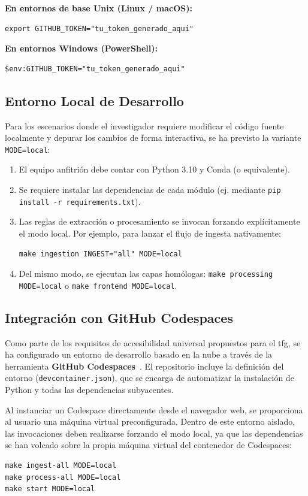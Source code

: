 \textbf{En entornos de base Unix (Linux / macOS):}
\begin{verbatim}
export GITHUB_TOKEN="tu_token_generado_aqui"
\end{verbatim}

\textbf{En entornos Windows (PowerShell):}
\begin{verbatim}
$env:GITHUB_TOKEN="tu_token_generado_aqui"
\end{verbatim}

\subsection{Entorno Local de Desarrollo}
Para los escenarios donde el investigador requiere modificar el código fuente
localmente y depurar los cambios de forma interactiva, se ha previsto la
variante \texttt{MODE=local}:
\begin{enumerate}
    \item El equipo anfitrión debe contar con Python 3.10 y Conda (o equivalente).
    \item Se requiere instalar las dependencias de cada módulo (ej. mediante \texttt{pip
              install -r requirements.txt}).
    \item Las reglas de extracción o procesamiento se invocan forzando explícitamente el
          modo local. Por ejemplo, para lanzar el flujo de ingesta nativamente:
          \begin{verbatim}
make ingestion INGEST="all" MODE=local
          \end{verbatim}
    \item Del mismo modo, se ejecutan las capas homólogas: \texttt{make processing
              MODE=local} o \texttt{make frontend MODE=local}.
\end{enumerate}

\subsection{Integración con GitHub Codespaces}
Como parte de los requisitos de accesibilidad universal propuestos para el
\acrshort{tfg}, se ha configurado un entorno de desarrollo basado en la nube a
través de la herramienta \textbf{GitHub
    Codespaces}~\cite{GitHubCodespacesDocs}. El repositorio incluye la definición
del entorno (\texttt{devcontainer.json}), que se encarga de automatizar la
instalación de Python y todas las dependencias subyacentes.

Al instanciar un Codespace directamente desde el navegador web, se proporciona
al usuario una máquina virtual preconfigurada. Dentro de este entorno aislado,
las invocaciones deben realizarse forzando el modo local, ya que las
dependencias se han volcado sobre la propia máquina virtual del contenedor de
Codespaces:
\begin{verbatim}
make ingest-all MODE=local
make process-all MODE=local
make start MODE=local
\end{verbatim}

